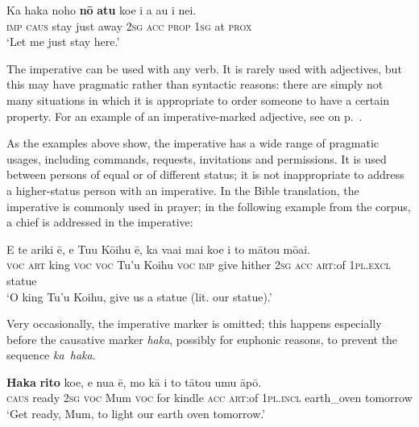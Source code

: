 \ea\label{ex:10.7}
\gll Ka haka noho \textbf{nō} \textbf{atu} koe i a au {\ꞌ}i nei. \\
\textsc{imp} \textsc{caus} stay just away \textsc{2sg} \textsc{acc} \textsc{prop} \textsc{1sg} at \textsc{prox} \\

\glt 
‘Let me just stay here.’ \textstyleExampleref{[R229.013]} 
\z

The imperative can be used with any verb. It is rarely used with adjectives, but this may have pragmatic rather than syntactic reasons: there are simply not many situations in which it is appropriate to order someone to have a certain property. For an example of an imperative-marked adjective, see  on p.~\pageref{ex:3.90}.

As the examples above show, the imperative has a wide range of pragmatic usages, including commands, requests, invitations and permissions. It is used between persons of equal or of different status; it is not inappropriate to address a higher-status person with an imperative. In the Bible translation, the imperative is commonly used in prayer; in the following example from the corpus, a chief is addressed in the imperative:

\ea\label{ex:10.8}
\gll E te {\ꞌ}ariki ē, e Tu{\ꞌ}u Kōihu ē, ka va{\ꞌ}ai mai koe  i to mātou mōai.\\
\textsc{voc} \textsc{art} king \textsc{voc} \textsc{voc} Tu’u Koihu \textsc{voc} \textsc{imp} give hither \textsc{2sg}  \textsc{acc} \textsc{art}:of \textsc{1pl.excl} statue\\

\glt 
‘O king Tu’u Koihu, give us a statue (lit. our statue).’ \textstyleExampleref{[Mtx-4-01.048]}
\z

Very occasionally, the imperative marker is omitted; this happens especially before the causative marker \textit{haka}, possibly for euphonic reasons, to prevent the sequence \textit{ka~haka}.

\ea\label{ex:10.9}
\gll \textbf{Haka} \textbf{rito} koe, e nua ē, mo kā i to tātou {\ꞌ}umu āpō. \\
\textsc{caus} ready \textsc{2sg} \textsc{voc} Mum \textsc{voc} for kindle \textsc{acc} \textsc{art}:of \textsc{1pl.incl} earth\_oven tomorrow \\

\glt 
‘Get ready, Mum, to light our earth oven tomorrow.’ \textstyleExampleref{[R352.041]} 
\z

